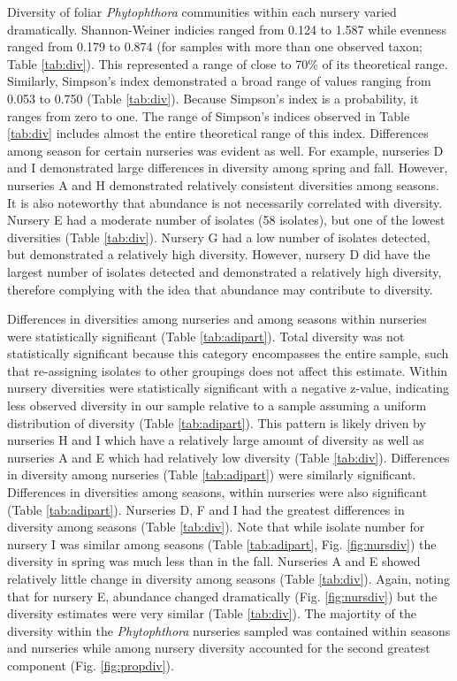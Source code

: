 \documentclass[12pt]{article}
\begin{document}
Diversity of foliar \emph{Phytophthora} communities within each nursery varied dramatically.  Shannon-Weiner indicies ranged from 0.124 to 1.587 while evenness ranged from 0.179 to 0.874 (for samples with more than one observed taxon; Table \ref{tab:div}).  This represented a range of close to 70\% of its theoretical range.  Similarly, Simpson's index demonstrated a broad range of values ranging from 0.053 to 0.750 (Table \ref{tab:div}).  Because Simpson's index is a probability, it ranges from zero to one.  The range of Simpson's indices observed in Table \ref{tab:div} includes almost the entire theoretical range of this index.  Differences among season for certain nurseries was evident as well.  For example, nurseries D and I demonstrated large differences in diversity among spring and fall.  However, nurseries A and H demonstrated relatively consistent diversities among seasons.  It is also noteworthy that abundance is not necessarily correlated with diversity.  Nursery E had a moderate number of isolates (58 isolates), but one of the lowest diversities (Table \ref{tab:div}).  Nursery G had a low number of isolates detected, but demonstrated a relatively high diversity.  However, nursery D did have the largest number of isolates detected and demonstrated a relatively high diversity, therefore complying with the idea that abundance may contribute to diversity.

Differences in diversities among nurseries and among seasons within nurseries were statistically significant (Table \ref{tab:adipart}).  Total diversity was not statistically significant because this category encompasses the entire sample, such that re-assigning isolates to other groupings does not affect this estimate.  Within nursery diversities were statistically significant with a negative z-value, indicating less observed diversity in our sample relative to a sample assuming a uniform distribution of diversity (Table \ref{tab:adipart}).  This pattern is likely driven by nurseries H and I which have a relatively large amount of diversity as well as nurseries A and E which had relatively low diversity (Table \ref{tab:div}).  Differences in diversity among nurseries (Table \ref{tab:adipart}) were similarly significant.  Differences in diversities among seasons, within nurseries were also significant (Table \ref{tab:adipart}).  Nurseries D, F and I had the greatest differences in diversity among seasons (Table \ref{tab:div}).  Note that while isolate number for nursery I was similar among seasons (Table \ref{tab:adipart}, Fig. \ref{fig:nursdiv}) the diversity in spring was much less than in the fall.  Nurseries A and E showed relatively little change in diversity among seasons (Table \ref{tab:div}).  Again, noting that for nursery E, abundance changed dramatically (Fig. \ref{fig:nursdiv}) but the diversity estimates were very similar (Table \ref{tab:div}).  The majortity of the diversity within the \emph{Phytophthora} nurseries sampled was contained within seasons and nurseries while among nursery diversity accounted for the second greatest component (Fig. \ref{fig:propdiv}).
\end{document}
